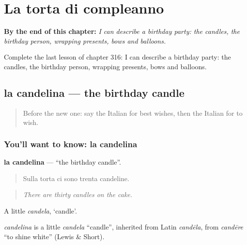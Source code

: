 
\chapter{La torta di compleanno}
\label{ch:it-la-torta-di-compleanno}

\begin{chapteropening}
\textbf{By the end of this chapter:} \emph{I can describe a birthday party: the candles, the birthday person, wrapping presents, bows and balloons.}

Complete the last lesson of chapter 316: I can describe a birthday party: the candles, the birthday person, wrapping presents, bows and balloons.
\end{chapteropening}

\section[la candelina]{la candelina — the birthday candle}

\label{lesson:IT-C316-candelina}



\begin{quote}
Before the new one: say the Italian for best wishes, then the Italian for to wish.
\end{quote}

\subsection*{You'll want to know: la candelina}
\textbf{la candelina} — \textquotedblleft{}the birthday candle\textquotedblright{}.

\begin{quote}
Sulla torta ci sono trenta candeline.
\end{quote}

\begin{quote}
\emph{There are thirty candles on the cake.}
\end{quote}

A little \emph{candela}, ‘candle’.

\begin{cousinweb}
\emph{candelina} is a little \emph{candela} \textquotedblleft{}candle\textquotedblright{}, inherited from Latin \emph{candēla}, from \emph{candēre} \textquotedblleft{}to shine white\textquotedblright{} (Lewis \& Short).
\end{cousinweb}

